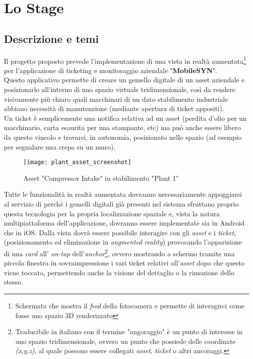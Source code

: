 
\chapter{Lo Stage}
\label{cap:lo-stage}
\section{Descrizione e temi}
Il progetto proposto prevede l'implementazione di una vista in realtà aumentata\footnote{Schermata che mostra il \textit{feed} della fotocamera e permette di interagirci come fosse uno spazio 3D renderizzato} per l'applicazione di ticketing e monitoraggio aziendale "\textbf{MobileSYN}".\\
Questo applicativo permette di creare un gemello digitale di un asset aziendale e posizionarlo all'interno di uno spazio virtuale tridimensionale, così da rendere visivamente più chiaro quali macchinari di un dato stabilimento industriale abbiano necessità di manutenzione (mediante apertura di ticket appositi).\\
Un ticket è semplicemente una notifica relativa ad un asset (perdita d'olio per un macchinario, carta esaurita per una stampante, etc) ma può anche essere libero da questo vincolo e trovarsi, in autonomia, posizionato nello spazio (ad esempio per segnalare una crepa su un muro).

\begin{figure}[ht]
    \centering
    \texttt{[image: plant\_asset\_screenshot]}
    \caption{Asset "Compressor Intake" in stabilimento "Plant 1"}
\end{figure}

Tutte le funzionalità in realtà aumentata dovranno necessariamente appoggiarsi al servizio di \asa{} perchè i gemelli digitali già presenti nel sistema sfruttano proprio questa tecnologia per la propria localizzazione spaziale e, vista la natura multipiattaforma dell'applicazione, dovranno essere implementate sia in Android che in iOS.
Dalla vista dovrà essere possibile interagire con gli \textit{asset} e i \textit{ticket}, (posizionamento ed eliminazione in \textit{augmented reality}) provocando l'apparizione di una \textit{card} all' \textit{on-tap} dell'\textit{anchor}\footnote{Traducibile in italiano con il termine "angoraggio" è un punto di interesse in uno spazio tridimensionale, ovvero un punto che possiede delle coordinate \textit{(x,y,z)}, al quale possono essere collegati \textit{asset}, \textit{ticket} o altri ancoraggi.}, ovvero mostrando a schermo tramite una piccola finestra in sovraimpressione i vari ticket relativi all'\textit{asset} dopo che questo viene toccato, permettendo anche la visione del dettaglio o la rimozione dello stesso.

